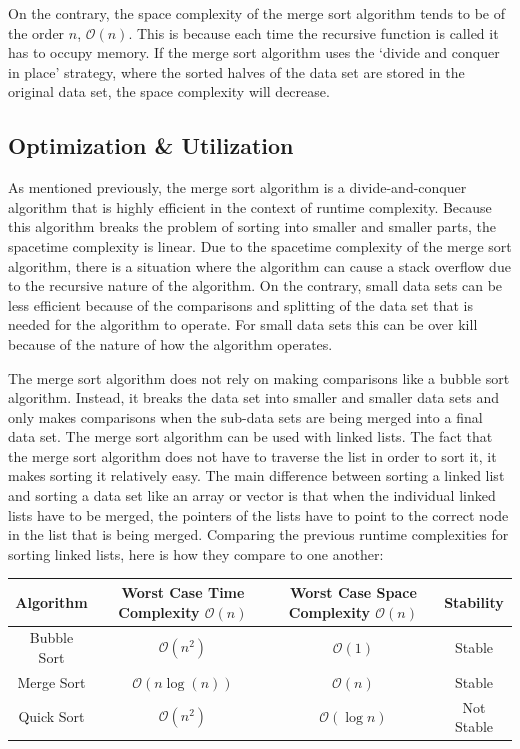 \documentclass[a4paper,9pt]{article}
\begin{document}
\begin{highlight}
    On the contrary, the space complexity of the merge sort algorithm tends to be of the order $n$, $\mathcal{O}(n)$. This is because each time the recursive function is called it has to occupy memory. If the merge sort algorithm uses the `divide and conquer in place' strategy, where the sorted halves of the data set are stored in the original data set, 
    the space complexity will decrease.
\end{highlight}

\subsection*{Optimization \& Utilization}

As mentioned previously, the merge sort algorithm is a divide-and-conquer algorithm that is highly efficient in the context of runtime complexity. Because this algorithm breaks the problem of sorting into smaller and smaller parts, the spacetime complexity is linear. Due to the spacetime complexity of the merge sort algorithm, there is a situation
where the algorithm can cause a stack overflow due to the recursive nature of the algorithm. On the contrary, small data sets can be less efficient because of the comparisons and splitting of the data set that is needed for the algorithm to operate. For small data sets this can be over kill because of the nature of how the algorithm operates.

The merge sort algorithm does not rely on making comparisons like a bubble sort algorithm. Instead, it breaks the data set into smaller and smaller data sets and only makes comparisons when the sub-data sets are being merged into a final data set. The merge sort algorithm can be used with linked lists. The fact that the merge sort algorithm does not 
have to traverse the list in order to sort it, it makes sorting it relatively easy. The main difference between sorting a linked list and sorting a data set like an array or vector is that when the individual linked lists have to be merged, the pointers of the lists have to point to the correct node in the list that is being merged. Comparing the previous 
runtime complexities for sorting linked lists, here is how they compare to one another:

\begin{center}
    \begin{tabular}{|c|c|c|c|}
        \hline \textbf{Algorithm} & \textbf{Worst Case Time Complexity $\mathcal{O}(n)$} & \textbf{Worst Case Space Complexity $\mathcal{O}(n)$} & \textbf{Stability} \\ \hline
        Bubble Sort & \textbf{$\mathcal{O}(n^2)$} & \textbf{$\mathcal{O}(1)$} & Stable \\ \hline
        Merge Sort & \textbf{$\mathcal{O}(n\log{(n)})$} & \textbf{$\mathcal{O}(n)$} & Stable \\ \hline
        Quick Sort & \textbf{$\mathcal{O}(n^2)$} & \textbf{$\mathcal{O}(\log{n})$} & Not Stable \\ \hline
    \end{tabular}
\end{center}
\end{document}
